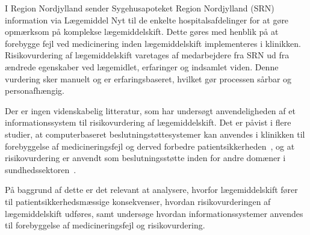 I Region Nordjylland sender Sygehusapoteket Region Nordjylland (SRN) information via Lægemiddel Nyt til de enkelte hospitalsafdelinger for at gøre opmærksom på komplekse lægemiddelskift. Dette gøres med henblik på at forebygge fejl ved medicinering inden lægemiddelskift implementeres i klinikken. Risikovurdering af lægemiddelskift varetages af medarbejdere fra SRN ud fra ændrede egenskaber ved lægemidlet, erfaringer og indsamlet viden. Denne vurdering sker manuelt og er erfaringsbaseret, hvilket gør processen sårbar og personafhængig.

Der er ingen videnskabelig litteratur, som har undersøgt anvendeligheden af et informationssystem til risikovurdering af lægemiddelskift. 
Det er påvist i flere studier, at computerbaseret beslutningstøttesystemer kan anvendes i klinikken til forebyggelse af medicineringsfejl og derved forbedre patientsikkerheden~\citep{Agrawal2009, Stenner2010, Fischer2008, Simpson2008}, og at risikovurdering er anvendt som beslutningsstøtte inden for andre domæner i sundhedssektoren~\citep{Geissert2018, Rawshani2018}. 

På baggrund af dette er det relevant at analysere, hvorfor lægemiddelskift fører til patientsikkerhedsmæssige konsekvenser, hvordan risikovurderingen af lægemiddelskift udføres, samt undersøge hvordan informationssystemer anvendes til forebyggelse af medicineringsfejl og risikovurdering.
